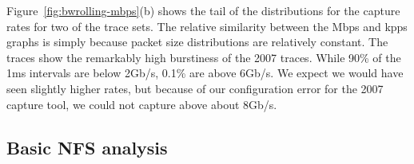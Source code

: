 Figure~\ref{fig:bwrolling-mbps}(b) shows the tail of the distributions for
the capture rates for two of the trace sets.  The relative similarity
between the Mbps and kpps graphs is simply because packet size
distributions are relatively constant.  The traces show the remarkably high
burstiness of the 2007 traces.  While 90\% of the 1ms intervals are
below 2Gb/s, 0.1\% are above 6Gb/s.  We expect we would have seen
slightly higher rates, but because of our configuration error for the
2007 capture tool, we could not capture above about 8Gb/s.

\begin{figure*}
\caption{Bandwidth measured in the collection process.  In Figure (b),
anim-2007/set-5 at different intervals is the top group of 4 lines, and
anim-2003/set-12 is the bottom group of 4 lines. With 60s intervals, 
anim-2003/set-12 does not show the 0.9999 quantile 
because there were insufficient data points.}
\label{fig:bwrolling-mbps}
\end{figure*}


\subsection{Basic NFS analysis}


